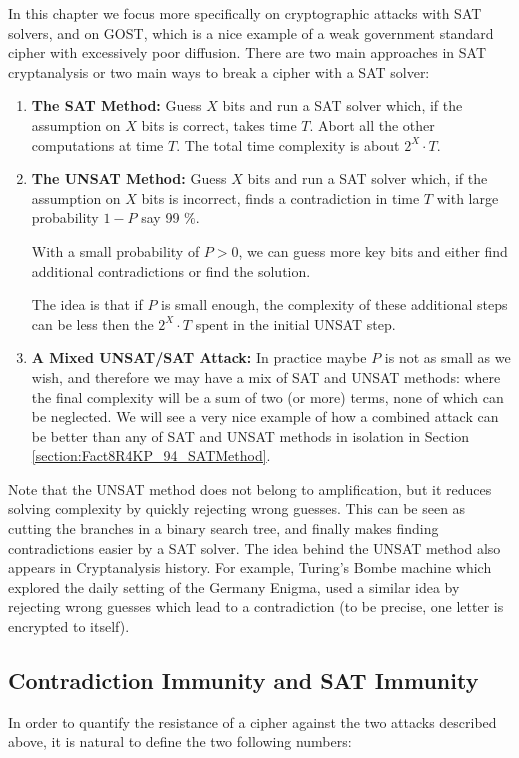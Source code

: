 In this chapter we focus more specifically on cryptographic attacks with SAT solvers, and on GOST, which is a nice example
of a weak government standard cipher with excessively poor diffusion. There are two main approaches in SAT cryptanalysis
or two main ways to break a cipher with a SAT solver:

\begin{enumerate}
	\item
	{\bf The SAT Method:}
	Guess $X$ bits and run a SAT solver which,
	if the assumption on $X$ bits is correct, takes time $T$.
	Abort all the other computations at time $T$.
	The total time complexity is about $2^{X}\cdot T$.
	\item
	{\bf The UNSAT Method:}
	Guess $X$ bits and run a SAT solver which,
	if the assumption on $X$ bits is incorrect,
	finds a contradiction in time $T$
	with large probability $1-P$ say 99 $\%$.
	
	With a small probability of $P>0$,
	we can guess more key bits
	and either find additional contradictions
	or find the solution.
	
	The idea is that if $P$ is small enough, the complexity of
	these additional steps can be less then the $2^{X}\cdot T$ spent
	in the initial UNSAT step.
	
	\item
	{\bf A Mixed UNSAT/SAT Attack:}
	In practice maybe $P$ is not as small as we wish, and therefore we may have
	a mix of SAT and UNSAT methods:
	where the final complexity will be a sum of two (or more) terms, none of which can be neglected.
	We will see a very nice example of
	how a combined attack can be better
	than any of SAT and UNSAT methods in isolation
	in Section \ref{section:Fact8R4KP_94_SATMethod}.
\end{enumerate}

Note that the UNSAT method does not belong to amplification, but it reduces solving complexity by quickly rejecting wrong guesses. This can be seen as cutting the branches in a binary search tree, and finally makes finding contradictions easier by a SAT solver. The idea behind the UNSAT method also appears in Cryptanalysis history. For example, Turing's Bombe machine which explored the daily setting of the Germany Enigma, used a similar idea by rejecting wrong guesses which lead to a contradiction (to be precise, one letter is encrypted to itself).

\subsection{Contradiction Immunity and SAT Immunity}
In order to quantify the resistance of a cipher against the two attacks described above,
it is natural to define the two following numbers:

